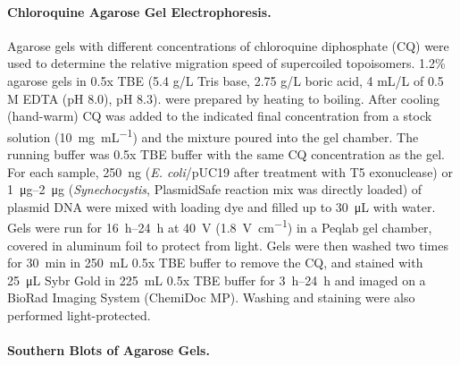 \documentclass[10pt,a4]{article}
\newcommand{\ugml}{\micro\gram\per\milli\liter}
\newcommand{\mL}{\milli\liter}
\newcommand{\scyst}{\textit{Synechocystis}}
\newcommand{\remove}[1]{\begingroup\color{gray}\endgroup}
\begin{document}
\remove{To test plasmid relaxation by topoisomerase I pooled samples
  from light and dark phases were split and for each reaction
  \SI{10}{\uL} of plasmid extracts were mixed with \SI{5}{\uL} 3x
  reaction buffer (150 mM Tris, 150 mM KCl, 30 mM MgCl2 , 1.5 mM DTT,
  0.3 mM EDTA, \SI{90}{\ugml} BSA) with or without 1 U of TopoI
  (Invitrogen, Cat. no. 38042-024). The reactions were incubated at
  \SI{37}{\celsius} and stopped after the indicated times by addition
  of \SI{3}{\uL} of 6x DNA loading dye with \SI{1}{\percent} SDS at
  \SI{80}{\celsius} for \SI{15}{\minute}. The resulting \SI{18}{\uL}
  were loaded onto the agarose gel (Fig. \ref{fig:diurnalcq}E).}

\paragraph{Chloroquine Agarose Gel Electrophoresis.}
Agarose gels with different concentrations of chloroquine diphosphate
(CQ) were used to determine the relative migration speed of
supercoiled topoisomers. 1.2\% agarose gels in 0.5x TBE (5.4 g/L Tris
base, 2.75 g/L boric acid, 4 mL/L of 0.5 M EDTA (pH 8.0), pH 8.3).
were prepared by heating to boiling. After cooling (hand-warm) CQ was
added to the indicated final concentration from a stock solution
(\SI{10}{\milli\gram\per\milli\liter}) and the mixture poured into the
gel chamber. The running buffer was 0.5x TBE buffer with the same CQ
concentration as the gel. For each sample, \SI{250}{\ng}
(\textit{E. coli}/pUC19 after treatment with T5 exonuclease) or
\SIrange{1}{2}{\ug} (\scyst{}, PlasmidSafe reaction mix was directly
loaded) of plasmid DNA were mixed with loading dye and filled up to
\SI{30}{\uL} with water.  Gels were run for \SIrange{16}{24}{\hour} at
\SI{40}{\volt} (\SI{1.8}{\volt\per\cm}) in a Peqlab gel chamber,
covered in aluminum foil to protect from light. Gels were then washed
two times for \SI{30}{\minute} in \SI{250}{\mL} 0.5x TBE buffer to
remove the CQ, and stained with \SI{25}{\uL} Sybr Gold in
\SI{225}{\mL} 0.5x TBE buffer for \SIrange{3}{24}{\hour} and imaged on
a BioRad Imaging System (ChemiDoc MP). Washing and staining were also
performed light-protected.

\paragraph{Southern Blots of Agarose Gels.}
\end{document}
